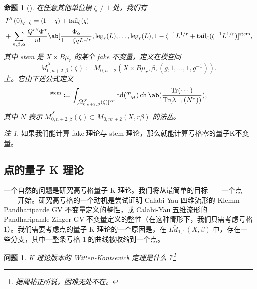\documentclass{amsart}
\newtheorem{prop}[thm]{命题}
\newtheorem{quest}[thm]{问题}
\theoremstyle{definition}
\theoremstyle{remark}
\newtheorem{rmk}[thm]{注}
\theoremstyle{plain}
\theoremstyle{definition}
\theoremstyle{remark}
\newcommand{\mr}[1]{\mathrm{#1}}
\newcommand{\on}[1]{\operatorname{#1}}
\newcommand{\1}{\mathbf{1}}
\newcommand{\2}{\mathbf{2}}
\newcommand{\3}{\mathbf{3}}
\newcommand{\vir}{\mr{vir}}
\begin{document}
\begin{prop}[{\cite{GiventalTonita2014}}]
    在任意其他单位根 \(\zeta \neq 1\) 处，我们有
    \begin{align*}
        &J^K(0)_{q = \zeta} = (1-q) + \mr{tail}_{\zeta}(q) \\
        &+ \sum_{n,\beta,\alpha} \frac{Q^{r\beta}\Phi^{\alpha}}{n!} \ab[\frac{\Phi_{\alpha}}{1-\zeta q L^{1/r}}, \mr{leg}_r(L), \ldots, \mr{leg}_r(L), 1 - \zeta^{-1}L^{1/r} + \mr{tail}_{\zeta}(\zeta^{-1} L^{1/r})]^{\mr{stem}},
    \end{align*}
    其中 stem 是 \(X \times B\mu_r\) 的某个 fake 不变量，定义在模空间
    \[ \bar{M}_{0,n+2,\beta}^X(\zeta) \coloneqq \bar{M}_{0,n+2}(X \times B\mu_r, \beta, (g, 1, \ldots, 1, g^{-1})). \]
    上。它由下述公式定义
    \begin{align*}
        [\cdots]^{\mr{stem}} \coloneqq \int_{[\bar{M}_{0,n+2,\beta}^X(\zeta)]^{\vir}} \on{td}(T_{\bar{M}}) \on{ch}\ab(\frac{\on{Tr}(\cdots)}{\on{Tr}(\lambda_{-1}(N^*))}), 
    \end{align*}
    其中 \(N\) 表示 \(\bar{M}_{0,n+2,\beta}^X(\zeta) \subset \bar{M}_{0,nr+2}(X, r\beta)\) 的法丛。
\end{prop}

\begin{rmk}
    如果我们能计算 fake 理论与 stem 理论，那么就能计算亏格零的量子K不变量。
\end{rmk}
\subsection{点的量子 K 理论}%
\label{sub:Quantum K-theory of a point}

一个自然的问题是研究高亏格量子 K 理论。我们将从最简单的目标——一个点——开始。研究高亏格的一个动机是尝试证明 Calabi-Yau 四维流形的 Klemm-Pandharipande GV 不变量定义的整性，或 Calabi-Yau 五维流形的 Pandharipande-Zinger GV 不变量定义的整性（在这种情形下，我们只需考虑亏格 \(1\)）。我们需要考虑点的量子 K 理论的一个原因是，在 \(I\bar{M}_{1,1}(X, \beta)\) 中，存在一些分支，其中一整条亏格 \(1\) 的曲线被收缩到一个点。

\begin{quest}
    K 理论版本的 Witten-Kontsevich 定理是什么？\footnote{据周祐正所说，困难无处不在。}
\end{quest}
\end{document}
